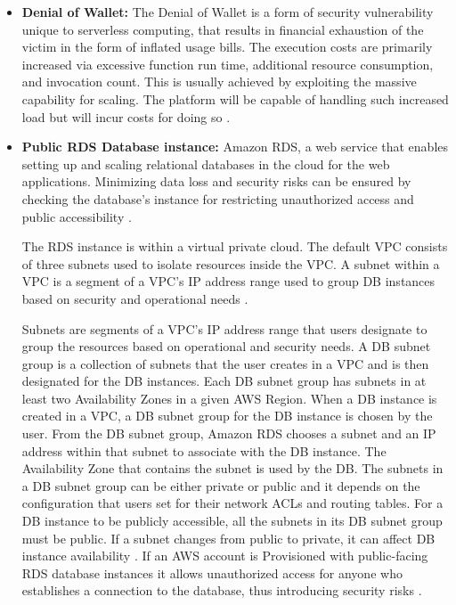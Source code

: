 \begin{itemize}
    \item \textbf{Denial of Wallet:} The Denial of Wallet is a form of security vulnerability unique to serverless
    computing,
    that results in financial exhaustion of the victim in the form of inflated usage bills.
    The execution costs are
    primarily increased via excessive function run time, additional resource consumption, and invocation count.
    This
    is usually achieved by exploiting the massive capability for scaling.
    The platform will be capable of handling
    such increased load but will incur costs for doing so \cite{54} \cite{55} \cite{56}.
\end{itemize}

\begin{itemize}
    \item \textbf{Public RDS Database instance:} Amazon RDS, a web service that enables setting up and scaling
    relational databases in the cloud for the web applications.
    Minimizing data loss and security risks can be
    ensured by checking the database’s instance for restricting unauthorized access and public accessibility \cite{57}.

    The RDS instance is within a virtual private cloud.
    The default VPC consists of three subnets used to 
    isolate resources inside the VPC. A subnet within a 
    VPC is a segment of a VPC's IP address range used to 
    group DB instances based on security and operational 
    needs \cite{58}.

    Subnets are segments of a VPC's IP address range that users designate to group the resources based on operational and security needs. A DB subnet group is a collection of subnets that the user creates in a VPC and is then designated for the DB instances. Each DB subnet group has subnets in at least two Availability Zones in a given AWS Region. When a DB instance is created in a VPC, a DB subnet group for the DB instance is chosen by the user. From the DB subnet group, Amazon RDS chooses a subnet and an IP address within that subnet to associate with the DB instance. The Availability Zone that contains the subnet is used by the DB. The subnets in a DB subnet group can be either private or public and it depends on the configuration that users set for their network ACLs and routing tables. For a DB instance to be publicly accessible, all the subnets in its DB subnet group must be public. If a subnet changes from public to private, it can affect DB instance availability \cite{58}. If an AWS account is Provisioned with public-facing RDS database instances it allows unauthorized access for anyone who establishes a connection to the database, thus introducing security risks \cite{59}.
\end{itemize}

